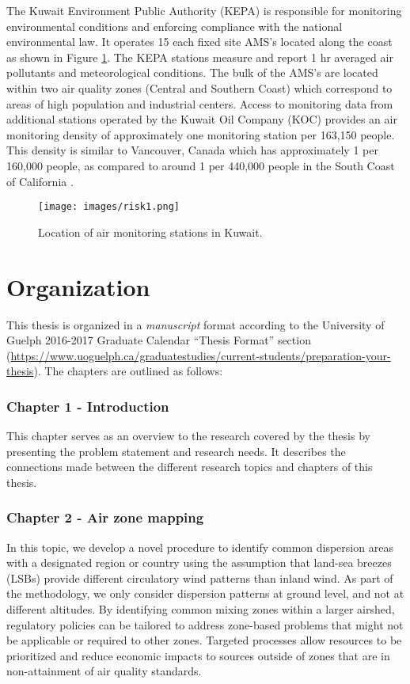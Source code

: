 The Kuwait Environment Public Authority (KEPA) is responsible for monitoring environmental conditions and enforcing compliance with the national environmental law. It operates 15 each fixed site AMS’s located along the coast as shown in Figure \ref{fig1:amskuwait}.  The KEPA stations measure and report 1 hr averaged air pollutants and meteorological conditions. The bulk of the AMS's are located within two air quality zones (Central and Southern Coast) which correspond to areas of high population and industrial centers. Access to monitoring data from additional stations operated by the Kuwait Oil Company (KOC) provides an air monitoring density of approximately one monitoring station per 163,150 people. This density is similar to Vancouver, Canada which has approximately 1 per 160,000 people, as compared to around 1 per 440,000 people in the South Coast of California \citep{Marshall2008}.

%  
\begin{figure}[H]
\centering
\texttt{[image: images/risk1.png]} 
\caption{Location of air monitoring stations in Kuwait.}
\label{fig1:amskuwait}
\end{figure}

\section{Organization}

This thesis is organized in a \textit{manuscript} format according to the University of Guelph 2016-2017 Graduate Calendar ``Thesis Format'' section (\url{https://www.uoguelph.ca/graduatestudies/current-students/preparation-your-thesis}).  The chapters are outlined as follows:

\subsubsection*{Chapter 1 - Introduction}

This chapter serves as an overview to the research covered by the thesis by presenting the problem statement and research needs. It describes the connections made between the different research topics and chapters of this thesis.

\subsubsection*{Chapter 2 - Air zone mapping}

In this topic, we develop a novel procedure to identify common dispersion areas with a designated region or country using the assumption that land-sea breezes (LSBs) provide different circulatory wind patterns than inland wind. As part of the methodology, we only consider dispersion patterns at ground level, and not at different altitudes. By identifying common mixing zones within a larger airshed, regulatory policies can be tailored to address zone-based problems that might not be applicable or required to other zones. Targeted processes allow resources to be prioritized and reduce economic impacts to sources outside of zones that are in non-attainment of air quality standards.

